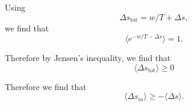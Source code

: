 \documentclass[12pt]{article}
\begin{document}
Using 
\begin{equation}
\Delta s_{\text{tot}}= w/T + \Delta s, 
\end{equation}
we find that
\begin{equation}
\langle e^{- w/T - \Delta s}\rangle = 1 .
\end{equation}

Therefore by Jensen's inequality, we find that 
\begin{equation}
\langle  \Delta s_{\text{tot}} \rangle \geq 0 
\end{equation}

Therefore we find that
\begin{equation}
\langle  \Delta s_m \rangle \geq  - \langle \Delta s \rangle  . 
\end{equation}






\end{document}
